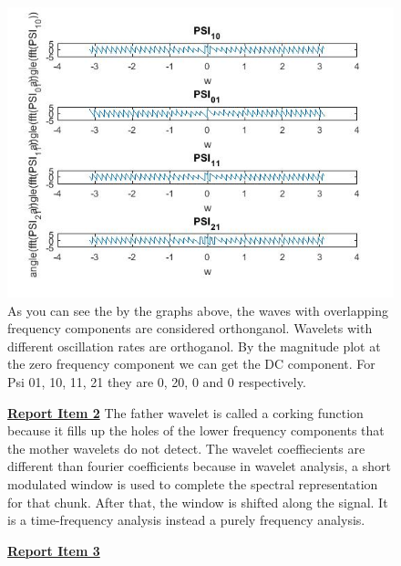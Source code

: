 \documentclass{article}
\begin{document}
\begin{figure}[H]
\includegraphics[scale=.5]{1_phase}
As you can see the by the graphs above, the waves with overlapping frequency components are considered orthonganol. Wavelets with different oscillation rates are orthoganol. By the magnitude plot at the zero frequency component we can get the DC component. For Psi 01, 10, 11, 21 they are 0, 20, 0 and 0 respectively.
\end{figure}
\begin{figure}[H]
\color{red}
\underline{\textbf{Report Item 2}}
\color{black}
The father wavelet is called a corking function because it fills up the holes of the lower frequency components that the mother wavelets do not detect. The wavelet coeffiecients are different than fourier coefficients because in wavelet analysis, a short modulated window is used to complete
the spectral representation for that chunk. After that, the window is shifted along the signal. It is a time-frequency analysis instead a purely frequency analysis.
\end{figure}


\begin{figure}[H]
\color{red}
\underline{\textbf{Report Item 3}}
\color{black}

\end{figure}
\end{document}
